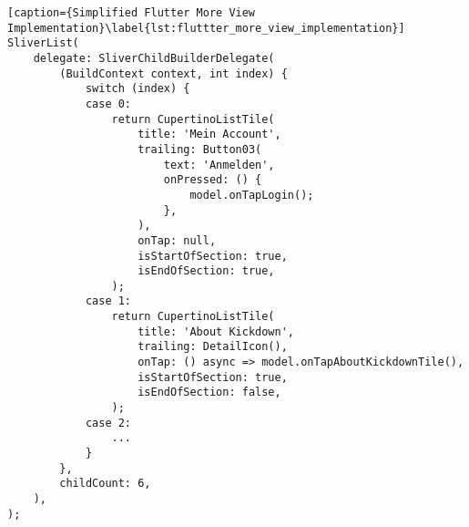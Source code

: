 \begin{minipage}{\linewidth}
    \begin{lstlisting}[caption={Simplified Flutter More View Implementation}\label{lst:fluttter_more_view_implementation}]
SliverList(
    delegate: SliverChildBuilderDelegate(
        (BuildContext context, int index) {
            switch (index) {
            case 0:
                return CupertinoListTile(
                    title: 'Mein Account',
                    trailing: Button03(
                        text: 'Anmelden',
                        onPressed: () {
                            model.onTapLogin();
                        },
                    ),
                    onTap: null,
                    isStartOfSection: true,
                    isEndOfSection: true,
                );
            case 1:
                return CupertinoListTile(
                    title: 'About Kickdown',
                    trailing: DetailIcon(),
                    onTap: () async => model.onTapAboutKickdownTile(),
                    isStartOfSection: true,
                    isEndOfSection: false,
                );
            case 2:
                ...
            }
        },
        childCount: 6,
    ),
);
    \end{lstlisting}
\end{minipage}